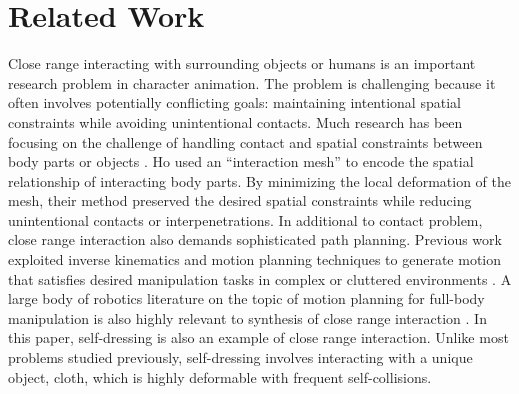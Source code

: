 \section{Related Work}

Close range interacting with surrounding objects or humans is an important research problem in character animation. The problem is challenging because it often involves potentially conflicting goals: maintaining intentional spatial constraints while avoiding unintentional contacts. Much research has been focusing on the challenge of handling contact and spatial constraints between body parts or objects \cite{Gleicher:1998:RMN,Liu:2006:CCO,Ho:2009:CMS,Kim:2009:SMM,Ho:2010:SRP}. Ho \etal {} used an ``interaction mesh'' to encode the spatial relationship of interacting body parts. By minimizing the local deformation of the mesh, their method preserved the desired spatial constraints while reducing unintentional contacts or interpenetrations. In additional to contact problem, close range interaction also demands sophisticated path planning. Previous work exploited inverse kinematics and motion planning techniques to generate motion that satisfies desired manipulation tasks in complex or cluttered environments \cite{Kallmann:2003:PCF,Yamane:2004:SAH}. A large body of robotics literature on the topic of motion planning for full-body manipulation is also highly relevant to synthesis of close range interaction \cite{Harada:2003:PMH,Takubo:2005:PAO,Yoshida:2005:HMP,Nishiwaki:2006:MCS}. In this paper, self-dressing is also an example of close range interaction. Unlike most problems studied previously, self-dressing involves interacting with a unique object, cloth, which is highly deformable with frequent self-collisions. 



